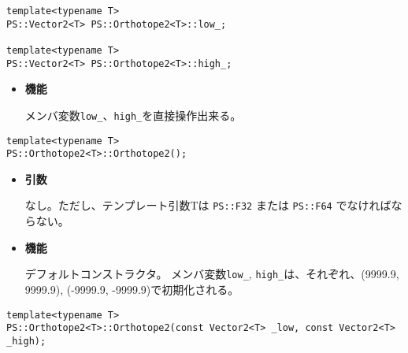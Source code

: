 
\begin{screen}
\begin{verbatim}
template<typename T>
PS::Vector2<T> PS::Orthotope2<T>::low_;

template<typename T>
PS::Vector2<T> PS::Orthotope2<T>::high_;
\end{verbatim}
\end{screen}

\begin{itemize}
  
\item{{\bf 機能}}
  
メンバ変数\texttt{low\_}、\texttt{high\_}を直接操作出来る。
  
\end{itemize}


\begin{screen}
\begin{verbatim}
template<typename T>
PS::Orthotope2<T>::Orthotope2();
\end{verbatim}
\end{screen}

\begin{itemize}

\item{{\bf 引数}}

なし。ただし、テンプレート引数Tは \texttt{PS::F32} または \texttt{PS::F64} でなければならない。

\item{{\bf 機能}}

デフォルトコンストラクタ。
メンバ変数\texttt{low\_}, \texttt{high\_}は、それぞれ、(9999.9, 9999.9), (-9999.9, -9999.9)で初期化される。

\end{itemize}
\begin{screen}
\begin{verbatim}
template<typename T>
PS::Orthotope2<T>::Orthotope2(const Vector2<T> _low, const Vector2<T> _high);
\end{verbatim}
\end{screen}

